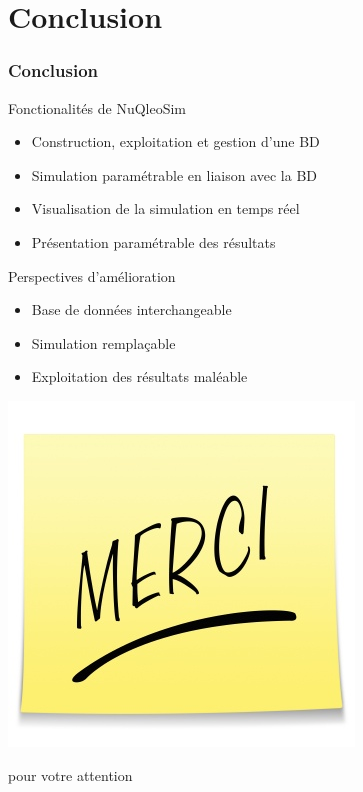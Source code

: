 \documentclass{beamer}
\begin{document}

\section*{Conclusion}

\begin{frame}
  \frametitle{Conclusion}

  \begin{block}{Fonctionalités de NuQleoSim}
    \begin{itemize}
    \item Construction, exploitation et gestion d'une BD
    \item Simulation paramétrable en liaison avec la BD
    \item Visualisation de la simulation en temps réel
    \item Présentation paramétrable des résultats
    \end{itemize}
  \end{block}
  \begin{block}{Perspectives d'amélioration}
    \begin{itemize}
    \item Base de données interchangeable
    \item Simulation remplaçable
    \item Exploitation des résultats maléable
    \end{itemize}
  \end{block}
\end{frame}


\begin{frame}
\begin{center}
\includegraphics[width=0.3\columnwidth]{img/merci.png}
\end{center}
\begin{center}pour votre attention\end{center}
\end{frame}
\end{document}
